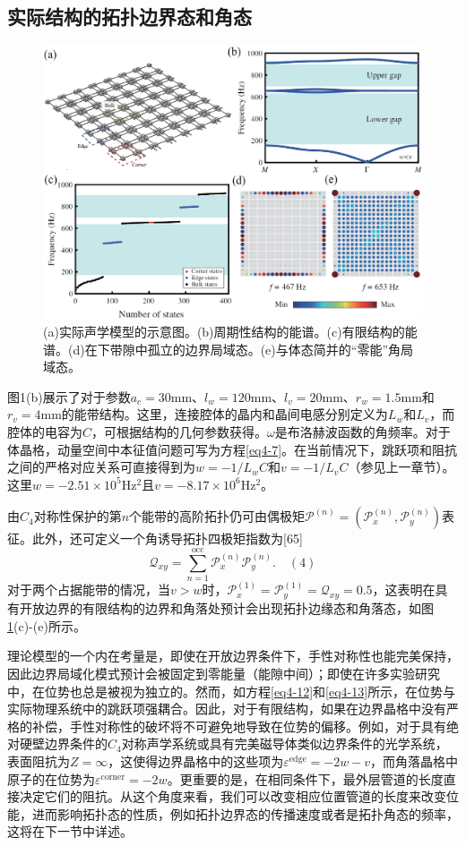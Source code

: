 \subsection{实际结构的拓扑边界态和角态}

\begin{figure}[h!]
    \centering
    \includegraphics[width=1\textwidth]{images/fig4-2.eps} 
    \caption{(a)实际声学模型的示意图。(b)周期性结构的能谱。(c)有限结构的能谱。(d)在下带隙中孤立的边界局域态。(e)与体态简并的“零能”角局域态。}
    \label{fig_4_2}
  \end{figure}  

图1(b)展示了对于参数$a_c = 30$mm、$l_w = 120$mm、$l_v = 20$mm、$r_w = 1.5$mm和$r_v = 4$mm的能带结构。这里，连接腔体的晶内和晶间电感分别定义为$L_w$和$L_v$，而腔体的电容为$C$，可根据结构的几何参数获得。$\omega$是布洛赫波函数的角频率。对于体晶格，动量空间中本征值问题可写为方程\ref{eq4-7}。在当前情况下，跳跃项和阻抗之间的严格对应关系可直接得到为$w = -1/L_wC$和$v = -1/L_vC$（参见上一章节）。这里$w = -2.51\times 10^5$Hz$^2$且$v = -8.17\times 10^6$Hz$^2$。

由$C_4$对称性保护的第$n$个能带的高阶拓扑仍可由偶极矩$\mathcal{P}^{(n)} = (\mathcal{P}_x^{(n)}, \mathcal{P}_y^{(n)})$表征。此外，还可定义一个角诱导拓扑四极矩指数为[65]
$$\mathcal{Q}_{xy} = \sum_{n = 1}^{\text{occ}} \mathcal{P}_x^{(n)} \mathcal{P}_y^{(n)}. \quad (4)$$
对于两个占据能带的情况，当$v > w$时，$\mathcal{P}_x^{(1)} = \mathcal{P}_y^{(1)} = \mathcal{Q}_{xy} = 0.5$，这表明在具有开放边界的有限结构的边界和角落处预计会出现拓扑边缘态和角落态，如图\ref{fig_4_2}(c)-(e)所示。

理论模型的一个内在考量是，即使在开放边界条件下，手性对称性也能完美保持，因此边界局域化模式预计会被固定到零能量（能隙中间）；即使在许多实验研究中，在位势也总是被视为独立的。然而，如方程\ref{eq4-12}和\ref{eq4-13}所示，在位势与实际物理系统中的跳跃项强耦合。因此，对于有限结构，如果在边界晶格中没有严格的补偿，手性对称性的破坏将不可避免地导致在位势的偏移。例如，对于具有绝对硬壁边界条件的$C_4$对称声学系统或具有完美磁导体类似边界条件的光学系统，表面阻抗为$Z = \infty$，这使得边界晶格中的这些项为$\varepsilon^{\text{edge}} = -2w - v$，而角落晶格中原子的在位势为$\varepsilon^{\text{corner}} = -2w$。更重要的是，在相同条件下，最外层管道的长度直接决定它们的阻抗。从这个角度来看，我们可以改变相应位置管道的长度来改变位能，进而影响拓扑态的性质，例如拓扑边界态的传播速度或者是拓扑角态的频率，这将在下一节中详述。


